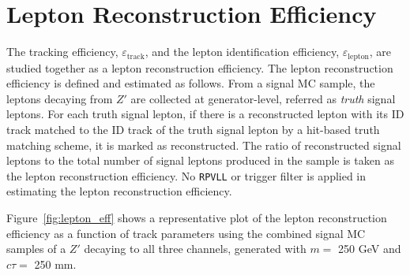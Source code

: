 \section{Lepton Reconstruction Efficiency}
\label{sec:tracking_efficiency}
The tracking efficiency, $\varepsilon_{\mathrm{track}}$, and the lepton identification efficiency, $\varepsilon_{\mathrm{lepton}}$, are studied together as a lepton reconstruction efficiency. The lepton reconstruction efficiency is defined and estimated as follows. From a signal MC sample, the leptons decaying from $Z'$ are collected at generator-level, referred as \textit{truth} signal leptons. For each truth signal lepton, if there is a reconstructed lepton with its ID track matched to the ID track of the truth signal lepton by a hit-based truth matching scheme, it is marked as reconstructed. The ratio of reconstructed signal leptons to the total number of signal leptons produced in the sample is taken as the lepton reconstruction efficiency. No \texttt{RPVLL} or trigger filter is applied in estimating the lepton reconstruction efficiency.

Figure~\ref{fig:lepton_eff} shows a representative plot of the lepton reconstruction efficiency as a function of track parameters using the combined signal MC samples of a $Z'$ decaying to all three channels, generated with $m = $ 250 GeV and $c\tau=$ 250 mm.

